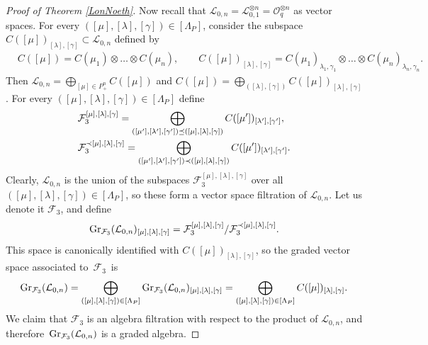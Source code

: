 \documentclass[10pt,a4paper]{amsart}
\numberwithin{equation}{section}
\theoremstyle{definition}
\newcommand{\Ll}{{\mathcal L}}
\begin{document}
\begin{proof}[Proof of Theorem \ref{LonNoeth}]
Now recall that $\Ll_{0,n} = {\mathcal L}_{0,1}^{\otimes n} = {\mathcal O}_q^{\otimes n}$ as vector spaces. For every $([\mu],[\lambda],[\gamma])\in[\Lambda_P]$, consider the subspace $C([\mu])_{[\lambda],[\gamma]}\subset \Ll_{0,n}$ defined by
\begin{align*}
&C([\mu]) =C(\mu_1)\otimes \dots \otimes C(\mu_n),\qquad
C([\mu])_{[\lambda],[\gamma]}=C(\mu_1)_{\lambda_1,\gamma_1}\otimes \dots \otimes C(\mu_n)_{\lambda_n,\gamma_n}.
\end{align*}
Then $ {\mathcal L}_{0,n}=\bigoplus_{[\mu]\in P_+^n} C({[\mu]})$ and $ C({[\mu]})=\bigoplus_{([\lambda],[\gamma])} C([\mu])_{[\lambda],[\gamma]}$. For every
$([\mu],[\lambda],[\gamma])\in [\Lambda_P]$ define
\begin{align}
&{\mathcal F}_3^{[\mu],[\lambda],[\gamma]} =\bigoplus_{([\mu'],[\lambda'],[\gamma'])\preceq ([\mu],[\lambda],[\gamma])} C([\mu'])_{[\lambda'],[\gamma']},\label{F2grad}\\
&{\mathcal F}_3^{\prec [\mu],[\lambda],[\gamma]} =\bigoplus_{([\mu'],[\lambda'],[\gamma'])\prec ([\mu],[\lambda],[\gamma])} C([\mu'])_{[\lambda'],[\gamma']}.\notag
\end{align}
Clearly, $\Ll_{0,n}$ is the union of the subspaces ${\mathcal F}_3^{[\mu],[\lambda],[\gamma]}$ over all $([\mu],[\lambda],[\gamma])\in [\Lambda_P]$, so these form a vector space filtration of $\Ll_{0,n}$. Let us denote it ${\mathcal F}_3$, and define
\[{\rm Gr}_{{\mathcal F}_3}({\mathcal L}_{0,n})_{[\mu],[\lambda],[\gamma]} = {\mathcal F}_3^{[\mu],[\lambda],[\gamma]}/{\mathcal F}_3^{\prec [\mu],[\lambda],[\gamma]}.\]
This space is canonically identified with $C({[\mu]})_{[\lambda],[\gamma]}$, so the graded vector space associated to~$\mathcal{F}_3$~is%
\begin{equation}\label{decompgrad}
{\rm Gr}_{{\mathcal F}_3}({\mathcal L}_{0,n}) = \bigoplus_{([\mu],[\lambda],[\gamma])\in [\Lambda_P]} {\rm Gr}_{{\mathcal F}_3}({\mathcal L}_{0,n})_{[\mu],[\lambda],[\gamma]} = \bigoplus_{([\mu],[\lambda],[\gamma])\in [\Lambda_P]} C({[\mu]})_{[\lambda],[\gamma]}.
\end{equation}
 We claim that ${\mathcal F}_3$ is an algebra filtration with respect to the product of $\Ll_{0,n}$, and therefore~${{\rm Gr}_{{\mathcal F}_3}({\mathcal L}_{0,n})}$ is a graded algebra.


\end{proof}
\end{document}
